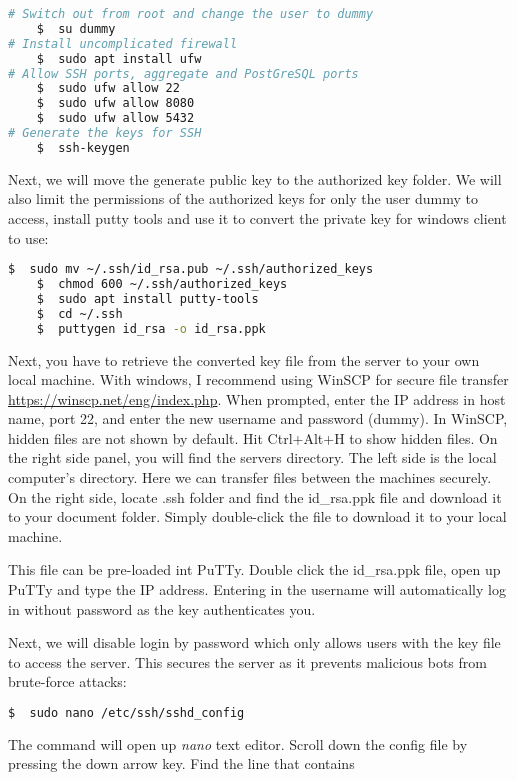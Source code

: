 \begin{lstlisting}[language=bash]
# Switch out from root and change the user to dummy
	$  su dummy             
# Install uncomplicated firewall
	$  sudo apt install ufw 
# Allow SSH ports, aggregate and PostGreSQL ports
	$  sudo ufw allow 22    
	$  sudo ufw allow 8080  
	$  sudo ufw allow 5432  
# Generate the keys for SSH
	$  ssh-keygen           
\end{lstlisting}

Next, we will move the generate public key to the authorized key folder. We will also limit the permissions of the authorized keys for only the user dummy to access, install putty tools and use it to convert the private key for windows client to use:

\begin{lstlisting}[language=bash]
	$  sudo mv ~/.ssh/id_rsa.pub ~/.ssh/authorized_keys
	$  chmod 600 ~/.ssh/authorized_keys
	$  sudo apt install putty-tools
	$  cd ~/.ssh
	$  puttygen id_rsa -o id_rsa.ppk
\end{lstlisting}

Next, you have to retrieve the converted key file from the server to your own local machine. With windows, I recommend using WinSCP for secure file transfer \url{https://winscp.net/eng/index.php}. When prompted, enter the IP address in host name, port 22, and enter the new username and password (dummy). In WinSCP, hidden files are not shown by default. Hit Ctrl+Alt+H to show hidden files. On the right side panel, you will find the servers directory. The left side is the local computer's directory. Here we can transfer files between the machines securely. On the right side, locate .ssh folder and find the id\_rsa.ppk file and download it to your document folder. Simply double-click the file to download it to your local machine.

This file can be pre-loaded int PuTTy. Double click the id\_rsa.ppk file, open up PuTTy and type the IP address. Entering in the username will automatically log in without password as the key authenticates you.

Next, we will disable login by password which only allows users with the key file to access the server. This secures the server as it prevents malicious bots from brute-force attacks:

\begin{lstlisting}[language=bash]
	$  sudo nano /etc/ssh/sshd_config
\end{lstlisting}

The command will open up \emph{nano} text editor. Scroll down the config file by pressing the down arrow key. Find the line that contains

